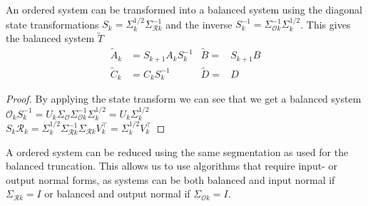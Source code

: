 \documentclass[doctype=mastersthesis,BCOR=15mm,biblatex]{ldvbook}%
\newcommand{\R}{\mathcal{R}} %
\newcommand{\Ob}{\mathcal{O}} %
\newcommand{\eye}{I} %
\begin{document}
\begin{itemize}

An ordered system can be transformed into a balanced system using the diagonal state transformations $S_k = \Sigma_k^{1/2}\Sigma_{\R k}^{-1}$ and the inverse $S_k^{-1} = \Sigma_{\Ob k}^{-1}\Sigma_k^{1/2}$.
This gives the balanced system $\tilde{T}$
\begin{align}
	\tilde{A}_k &= S_{k+1} A_k S_k^{-1}   & \tilde{B} =& S_{k+1} B \\
	\tilde{C}_k &= C_k S_k^{-1}   & \tilde{D} =& D 
\end{align}
\begin{proof}
	By applying the state transform we can see that we get a balanced system
	$\Ob_k S_k^{-1} = U_k \Sigma_\Ob \Sigma_{\Ob k}^{-1}\Sigma_k^{1/2} = U_k \Sigma_k^{1/2}$\\
	$S_k \R_k = \Sigma_k^{1/2}\Sigma_{\R k}^{-1} \Sigma_{\R k} V_k^\top = \Sigma_k^{1/2} V_k^\top$
\end{proof}

A ordered system can be reduced using the same segmentation as used for the balanced truncation.
This allows us to use algorithms that require input- or output normal forms, as systems can be both balanced and input normal if $\Sigma_{\R k}=\eye$ or balanced and output normal if $\Sigma_{\Ob k}=\eye$.


\end{itemize}
\end{document}
